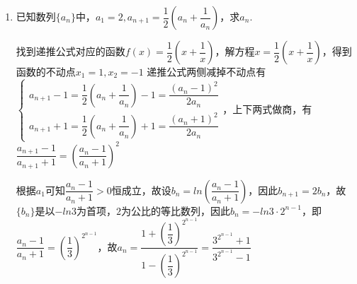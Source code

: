 \begin{enumerate}
\begin{jieda}
\begin{enumerate}
            \item 若$f(x)$有两个不同的不动点$x_1, x_2$，\\
            则$\left\{\begin{array}{l}
                 a_{n+1} - x_1 = f(a_n) - x_1 = \dfrac{(A-C \cdot x_1)a_n + B - Dx_1}{C\cdot a_n + D} = (a_n - x_1) \cdot \dfrac{A-C \cdot x_1}{C\cdot a_n + D} \\
                 a_{n+1} - x_2 = f(a_n) - x_2 = \dfrac{(A-C \cdot x_2)a_n + B - Dx_2}{C\cdot a_n + D} = (a_n - x_2) \cdot \dfrac{A-C \cdot x_2}{C\cdot a_n + D} 
            \end{array}\right.$
            \item 若$f(x)$没有不动点，则应考虑$\{a_n\}$为周期数列
        \end{enumerate}
    \end{jieda}
    \item 已知数列$\{a_n\}$中，$a_1 = 2, a_{n+1} = \dfrac{1}{2}\left(a_n+\dfrac{1}{a_n}\right)$，求$a_n$.
    \begin{jieda}
        找到递推公式对应的函数$f(x) = \dfrac{1}{2}\left(x + \dfrac{1}{x}\right)$，解方程$x = \dfrac{1}{2}\left(x + \dfrac{1}{x}\right)$，得到函数的不动点$x_1 = 1, x_2 = -1$
        递推公式两侧减掉不动点有$\left\{\begin{array}{l}
             a_{n+1} - 1 = \dfrac{1}{2}\left(a_n+\dfrac{1}{a_n}\right) - 1 = \dfrac{(a_n-1)^2}{2a_n}  \\
             a_{n+1} + 1 = \dfrac{1}{2}\left(a_n+\dfrac{1}{a_n}\right) + 1 = \dfrac{(a_n+1)^2}{2a_n}
        \end{array}\right.$，上下两式做商，有$\dfrac{a_{n+1} - 1}{a_{n+1} + 1} = \left(\dfrac{a_n - 1}{a_n + 1}\right)^2$
        
        根据$a_1$可知$\dfrac{a_n - 1}{a_n + 1} > 0$恒成立，故设$b_n = ln\left(\dfrac{a_n - 1}{a_n + 1}\right)$，因此$b_{n+1} = 2b_n$，故$\{b_n\}$是以$-ln3$为首项，$2$为公比的等比数列，因此$b_n = -ln3 \cdot 2^{n-1}$，即$\dfrac{a_n-1}{a_n+1} = \left(\dfrac{1}{3}\right)^{2^{n-1}}$，故$a_n = \dfrac{1+\left(\dfrac{1}{3}\right)^{2^{n-1}}}{1-\left(\dfrac{1}{3}\right)^{2^{n-1}}} = \dfrac{3^{2^{n-1}}+1}{3^{2^{n-1}}-1}$
    \end{jieda}
\end{enumerate}
